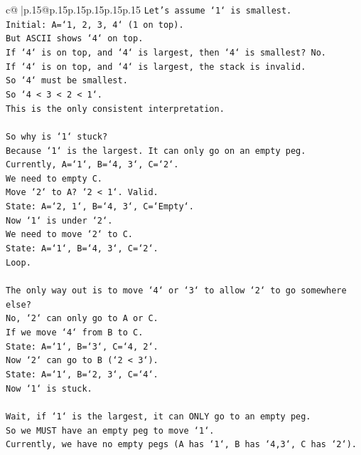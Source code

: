 \documentclass{article}
\begin{document}
{\begin{supertabular}{c@{$\;$}|p{.15\linewidth}@{}p{.15\linewidth}p{.15\linewidth}p{.15\linewidth}p{.15\linewidth}p{.15\linewidth}}
{{{\texttt{Let's assume `1` is smallest.} \\
\texttt{Initial: A=`1, 2, 3, 4` (1 on top).} \\
\texttt{But ASCII shows `4` on top.} \\
\texttt{If `4` is on top, and `4` is largest, then `4` is smallest? No.} \\
\texttt{If `4` is on top, and `4` is largest, the stack is invalid.} \\
\texttt{So `4` must be smallest.} \\
\texttt{So `4 < 3 < 2 < 1`.} \\
\texttt{This is the only consistent interpretation.} \\
\\ 
\texttt{So why is `1` stuck?} \\
\texttt{Because `1` is the largest. It can only go on an empty peg.} \\
\texttt{Currently, A=`1`, B=`4, 3`, C=`2`.} \\
\texttt{We need to empty C.} \\
\texttt{Move `2` to A? `2 < 1`. Valid.} \\
\texttt{State: A=`2, 1`, B=`4, 3`, C=`Empty`.} \\
\texttt{Now `1` is under `2`.} \\
\texttt{We need to move `2` to C.} \\
\texttt{State: A=`1`, B=`4, 3`, C=`2`.} \\
\texttt{Loop.} \\
\\ 
\texttt{The only way out is to move `4` or `3` to allow `2` to go somewhere else?} \\
\texttt{No, `2` can only go to A or C.} \\
\texttt{If we move `4` from B to C.} \\
\texttt{State: A=`1`, B=`3`, C=`4, 2`.} \\
\texttt{Now `2` can go to B (`2 < 3`).} \\
\texttt{State: A=`1`, B=`2, 3`, C=`4`.} \\
\texttt{Now `1` is stuck.} \\
\\ 
\texttt{Wait, if `1` is the largest, it can ONLY go to an empty peg.} \\
\texttt{So we MUST have an empty peg to move `1`.} \\
\texttt{Currently, we have no empty pegs (A has `1`, B has `4,3`, C has `2`).} \\
}}}
\end{supertabular}}
\end{document}
